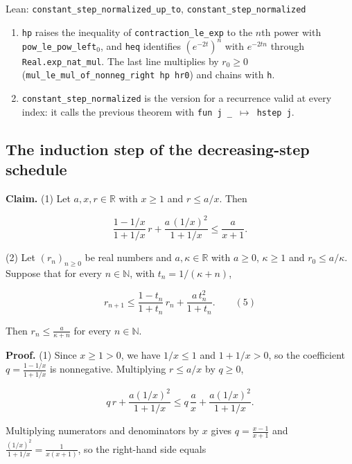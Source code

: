 \documentclass[11pt,a4paper]{report}
\begin{document}
\begin{leanbox}{Lean: \texttt{constant\_\allowbreak{}step\_\allowbreak{}normalized\_\allowbreak{}up\_\allowbreak{}to}, \texttt{constant\_\allowbreak{}step\_\allowbreak{}normalized}}
\begin{enumerate}
\item \texttt{hp} raises the inequality of \texttt{contraction\_\allowbreak{}le\_\allowbreak{}exp} to the \(n\)th power with \texttt{pow\_\allowbreak{}le\_\allowbreak{}pow\_\allowbreak{}left\ensuremath{{}_{0}}}, and \texttt{heq} identifies \((e^{-2t})^n\) with \(e^{-2tn}\) through \texttt{Real.\allowbreak{}exp\_\allowbreak{}nat\_\allowbreak{}mul}. The last line multiplies by \(r_0\ge0\) (\texttt{mul\_\allowbreak{}le\_\allowbreak{}mul\_\allowbreak{}of\_\allowbreak{}nonneg\_\allowbreak{}right hp hr0}) and chains with \texttt{h}.

\item \texttt{constant\_\allowbreak{}step\_\allowbreak{}normalized} is the version for a recurrence valid at every index: it calls the previous theorem with \texttt{fun j \_\allowbreak{} \ensuremath{\mapsto} hstep j}.

\end{enumerate}
\end{leanbox}
\subsection{\texorpdfstring{The induction step of the decreasing-step schedule}{The induction step of the decreasing-step schedule}}
\label{report-step-AverageLMC-Recurrence-lean-4}


\textbf{Claim.} (1) Let \(a,x,r\in\mathbb R\) with \(x\ge1\) and \(r\le a/x\). Then


\[\frac{1-1/x}{1+1/x}\,r+\frac{a\,(1/x)^2}{1+1/x}\le\frac a{x+1}.\]


(2) Let \((r_n)_{n\ge0}\) be real numbers and \(a,\kappa\in\mathbb R\) with \(a\ge0\), \(\kappa\ge1\) and \(r_0\le a/\kappa\). Suppose that for every \(n\in\mathbb N\), with \(t_n=1/(\kappa+n)\),


\[r_{n+1}\le\frac{1-t_n}{1+t_n}\,r_n+\frac{a\,t_n^2}{1+t_n}.\qquad(5)\]


Then \(r_n\le\frac a{\kappa+n}\) for every \(n\in\mathbb N\).




\textbf{Proof.} (1) Since \(x\ge1>0\), we have \(1/x\le1\) and \(1+1/x>0\), so the coefficient \(q=\frac{1-1/x}{1+1/x}\) is nonnegative. Multiplying \(r\le a/x\) by \(q\ge0\),


\[q\,r+\frac{a(1/x)^2}{1+1/x}\le q\,\frac ax+\frac{a(1/x)^2}{1+1/x}.\]


Multiplying numerators and denominators by \(x\) gives \(q=\frac{x-1}{x+1}\) and \(\frac{(1/x)^2}{1+1/x}=\frac1{x(x+1)}\), so the right-hand side equals
\end{document}
